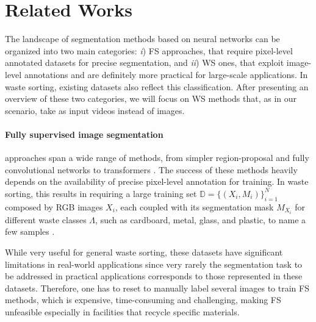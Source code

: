 \section{Related Works}
\label{sec:related} 

The landscape  of segmentation methods based on neural networks can be organized into two main categories: \emph{i})  FS approaches, that require pixel-level annotated datasets for precise segmentation, and \emph{ii}) WS ones, that exploit image-level annotations and are definitely more practical for large-scale applications.
In waste sorting, existing datasets also reflect this %
classification. After presenting an overview of these two categories, we will focus on WS methods that, as in our scenario, take as input videos instead of images.

\paragraph{Fully supervised image segmentation} approaches span a wide range of methods, from simpler region-proposal \cite{girshick2014rich, hariharan2014simultaneous, dai2015convolutional, caesar2016region, shen2020ranet} and fully convolutional networks \cite{noh2015learning, chen2018encoder, adeyinka2019deep, zhang2018exfuse} to transformers \cite{xie2021segformer}. The success of these methods heavily depends on the availability of precise pixel-level annotation for training. In waste sorting, this results in requiring a large training set \( \mathbb{D} = \{(X_i, M_i)\}_{i=1}^N \) composed by RGB images $X_i$, each coupled with its segmentation mask $M_{X_i}$ for different waste classes $\Lambda$, such as cardboard, metal, glass, and plastic, to name a few samples \cite{bashkirova2022zerowaste, 9395690, hong2020trashcan, sanchez2022cleansea, wang2020multi, proencca2020taco}. 

While very useful for general waste sorting, these datasets have significant limitations in real-world applications since very rarely the segmentation task to be addressed in practical applications corresponds to those represented in these datasets. Therefore, one has to reset to manually label several images to train FS methods, which is expensive, time-consuming and challenging, making FS unfeasible especially in facilities that recycle specific materials.


